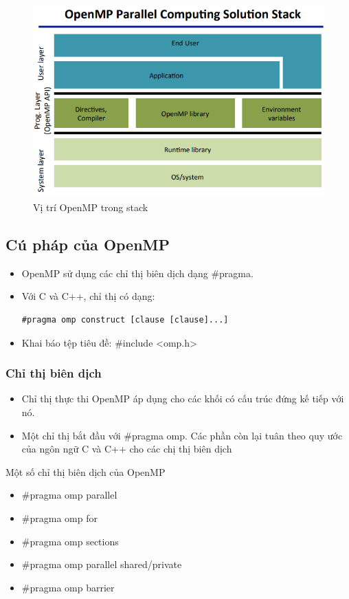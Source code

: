 \documentclass[14pt, a4paper]{article}
\numberwithin{equation}{section}
\numberwithin{figure}{section}
\numberwithin{dl}{section}
\numberwithin{md}{section}
\numberwithin{bd}{section}
\numberwithin{dn}{section}
\numberwithin{hq}{section}
\begin{document}
\begin{figure}[H]
    \centering
    \includegraphics[width=0.7\linewidth]{figures/OpenMP/OpenMP_Parallel_Computing_Solution_Stack.png}
    \caption{Vị trí OpenMP trong stack}
\end{figure}

\subsection{Cú pháp của OpenMP}

\begin{itemize}
    \item OpenMP sử dụng các chỉ thị biên dịch dạng \#pragma.
    \item Với C và C++, chỉ thị có dạng:
    \begin{verbatim}
#pragma omp construct [clause [clause]...]
    \end{verbatim}
    \item Khai báo tệp tiêu đề: \#include <omp.h>
\end{itemize}

\subsubsection{Chỉ thị biên dịch}

\begin{itemize}
    \item Chỉ thị thực thi OpenMP áp dụng cho các khối có cấu trúc đứng kế tiếp với nó.
    \item Một chỉ thị bắt đầu với \#pragma omp. Các phần còn lại tuân theo quy ước của ngôn ngữ C và C++ cho các chị thị biên dịch 
\end{itemize}

Một số chỉ thị biên dịch của OpenMP

\begin{itemize}
    \item \#pragma omp parallel
    \item \#pragma omp for
    \item \#pragma omp sections
    \item \#pragma omp parallel shared/private
    \item \#pragma omp barrier
\end{itemize}
\end{document}
